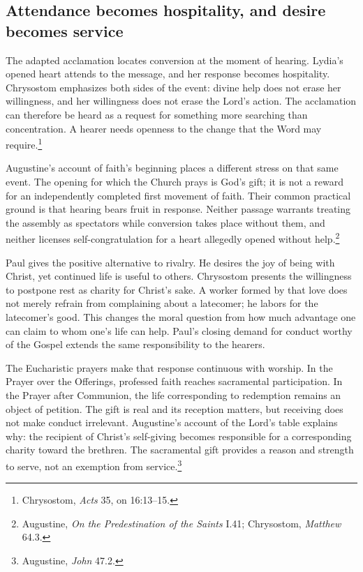 \subsection{Attendance becomes hospitality, and desire becomes service}
The adapted acclamation locates conversion at the moment of hearing. Lydia's opened heart attends to the message, and her response becomes hospitality. Chrysostom emphasizes both sides of the event: divine help does not erase her willingness, and her willingness does not erase the Lord's action. The acclamation can therefore be heard as a request for something more searching than concentration. A hearer needs openness to the change that the Word may require.\footnote{Chrysostom, \textit{Acts} 35, on 16:13--15.}

Augustine's account of faith's beginning places a different stress on that same event. The opening for which the Church prays is God's gift; it is not a reward for an independently completed first movement of faith. Their common practical ground is that hearing bears fruit in response. Neither passage warrants treating the assembly as spectators while conversion takes place without them, and neither licenses self-congratulation for a heart allegedly opened without help.\footnote{Augustine, \textit{On the Predestination of the Saints} I.41; Chrysostom, \textit{Matthew} 64.3.}

Paul gives the positive alternative to rivalry. He desires the joy of being with Christ, yet continued life is useful to others. Chrysostom presents the willingness to postpone rest as charity for Christ's sake. A worker formed by that love does not merely refrain from complaining about a latecomer; he labors for the latecomer's good. This changes the moral question from how much advantage one can claim to whom one's life can help. Paul's closing demand for conduct worthy of the Gospel extends the same responsibility to the hearers.

The Eucharistic prayers make that response continuous with worship. In the Prayer over the Offerings, professed faith reaches sacramental participation. In the Prayer after Communion, the life corresponding to redemption remains an object of petition. The gift is real and its reception matters, but receiving does not make conduct irrelevant. Augustine's account of the Lord's table explains why: the recipient of Christ's self-giving becomes responsible for a corresponding charity toward the brethren. The sacramental gift provides a reason and strength to serve, not an exemption from service.\footnote{Augustine, \textit{John} 47.2.}

